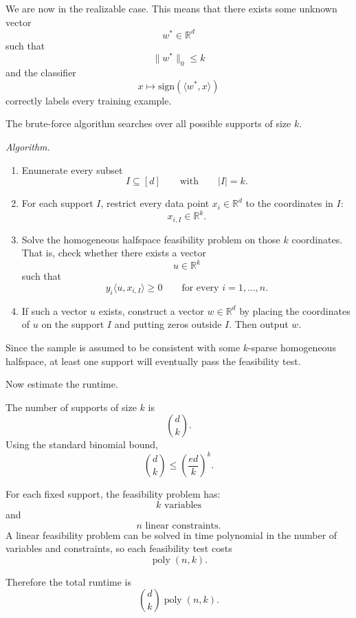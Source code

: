 \documentclass[11pt]{article}
\newcommand{\sign}{\mathrm{sign}}
\begin{document}
\begin{solutionbox}

We are now in the realizable case. This means that there exists some unknown vector
\[
w^\ast \in \mathbb R^d
\]
such that
\[
\|w^\ast\|_0 \le k
\]
and the classifier
\[
x \mapsto \sign(\langle w^\ast,x\rangle)
\]
correctly labels every training example.

The brute-force algorithm searches over all possible supports of size $k$.

\medskip

\textit{Algorithm.}
\begin{enumerate}[leftmargin=2em]
    \item Enumerate every subset
    \[
    I \subseteq [d]
    \qquad\text{with}\qquad
    |I|=k.
    \]

    \item For each support $I$, restrict every data point $x_i\in\mathbb R^d$ to the coordinates in $I$:
    \[
    x_{i,I}\in\mathbb R^k.
    \]

    \item Solve the homogeneous halfspace feasibility problem on those $k$ coordinates. That is, check whether there exists a vector
    \[
    u\in\mathbb R^k
    \]
    such that
    \[
    y_i\langle u,x_{i,I}\rangle \ge 0
    \qquad
    \text{for every } i=1,\dots,n.
    \]

    \item If such a vector $u$ exists, construct a vector $w\in\mathbb R^d$ by placing the coordinates of $u$ on the support $I$ and putting zeros outside $I$. Then output $w$.
\end{enumerate}

Since the sample is assumed to be consistent with some $k$-sparse homogeneous halfspace, at least one support will eventually pass the feasibility test.

\medskip

Now estimate the runtime.

The number of supports of size $k$ is
\[
\binom{d}{k}.
\]
Using the standard binomial bound,
\[
\binom{d}{k}
\le
\left(\frac{ed}{k}\right)^k.
\]

For each fixed support, the feasibility problem has:
\[
k \text{ variables}
\]
and
\[
n \text{ linear constraints}.
\]
A linear feasibility problem can be solved in time polynomial in the number of variables and constraints, so each feasibility test costs
\[
\operatorname{poly}(n,k).
\]

Therefore the total runtime is
\[
\binom{d}{k}\operatorname{poly}(n,k).
\]


\end{solutionbox}
\end{document}
